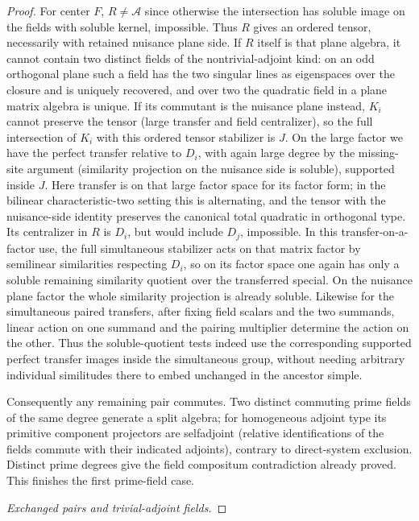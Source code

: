 \begin{proof}
For center \(F\), \(R\ne\mathcal A\) since otherwise the intersection has soluble image on the fields with soluble kernel, impossible. Thus \(R\) gives an ordered tensor, necessarily with retained nuisance plane side. If \(R\) itself is that plane algebra, it cannot contain two distinct fields of the nontrivial-adjoint kind: on an odd orthogonal plane such a field has the two singular lines as eigenspaces over the closure and is uniquely recovered, and over two the quadratic field in a plane matrix algebra is unique. If its commutant is the nuisance plane instead, \(K_i\) cannot preserve the tensor (large transfer and field centralizer), so the full intersection of \(K_i\) with this ordered tensor stabilizer is \(J\). On the large factor we have the perfect transfer relative to \(D_i\), with again large degree by the missing-site argument (similarity projection on the nuisance side is soluble), supported inside \(J\). Here transfer is on that large factor space for its factor form; in the bilinear characteristic-two setting this is alternating, and the tensor with the nuisance-side identity preserves the canonical total quadratic in orthogonal type. Its centralizer in \(R\) is \(D_i\), but would include \(D_j\), impossible. In this transfer-on-a-factor use, the full simultaneous stabilizer acts on that matrix factor by semilinear similarities respecting \(D_i\), so on its factor space one again has only a soluble remaining similarity quotient over the transferred special. On the nuisance plane factor the whole similarity projection is already soluble. Likewise for the simultaneous paired transfers, after fixing field scalars and the two summands, linear action on one summand and the pairing multiplier determine the action on the other. Thus the soluble-quotient tests indeed use the corresponding supported perfect transfer images inside the simultaneous group, without needing arbitrary individual similitudes there to embed unchanged in the ancestor simple.

Consequently any remaining pair commutes. Two distinct commuting prime fields of the same degree generate a split algebra; for homogeneous adjoint type its primitive component projectors are selfadjoint (relative identifications of the fields commute with their indicated adjoints), contrary to direct-system exclusion. Distinct prime degrees give the field compositum contradiction already proved. This finishes the first prime-field case.

\noindent\emph{Exchanged pairs and trivial-adjoint fields.}


\end{proof}
